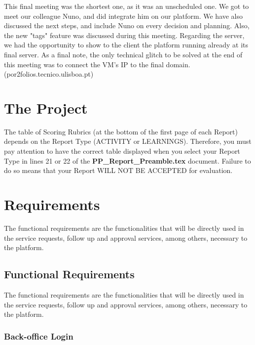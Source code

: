 \documentclass[a4paper,12pt,journal,twoside,compsoc]{PPIEEEtran}
\begin{document}
	This final meeting was the shortest one, as it was an unscheduled one. We got to meet our colleague Nuno, and did integrate him on our platform. We have also discussed the next steps, and include Nuno on every decision and planning. Also, the new "tags" feature was discussed during this meeting.
	Regarding the server, we had the opportunity to show to the client the platform running already at its final server.
	As a final note, the only technical glitch to be solved at the end of this meeting was to connect the VM's IP to the final domain.
	(por2folios.tecnico.ulisboa.pt)


\section{The Project}
The table of Scoring Rubrics (at the bottom of the first page of each Report) depends on the Report Type (ACTIVITY or LEARNINGS). Therefore, you must pay attention to have the correct table displayed when you select your Report Type in lines 21 or 22 of the \textbf{PP\_Report\_Preamble.tex} document. Failure to do so means that your Report WILL NOT BE ACCEPTED for evaluation.


\section{Requirements}

The functional requirements are the functionalities that will be directly used in the service requests, follow up and approval services, among others, necessary to the platform.

\subsection{Functional Requirements}

The functional requirements are the functionalities that will be directly used in the service requests, follow up and approval services, among others, necessary to the platform.

\subsubsection{Back-office Login}
\end{document}
